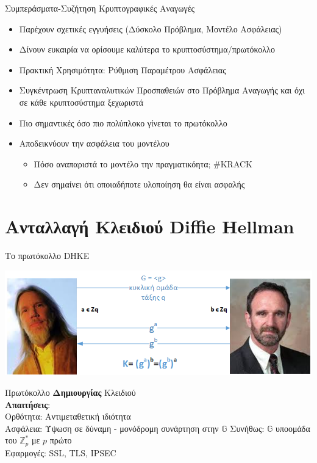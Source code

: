 \documentclass[handout]{beamer}
\begin{document}
\begin{frame}{Συμπεράσματα-Συζήτηση}
Κρυπτογραφικές Αναγωγές
\begin{itemize}
\item Παρέχουν σχετικές εγγυήσεις (Δύσκολο Πρόβλημα, Μοντέλο Ασφάλειας)
\item Δίνουν ευκαιρία να ορίσουμε καλύτερα το κρυπτοσύστημα/πρωτόκολλο
\item Πρακτική Χρησιμότητα: Ρύθμιση Παραμέτρου Ασφάλειας
\item Συγκέντρωση Κρυπταναλυτικών Προσπαθειών στο Πρόβλημα Αναγωγής και όχι σε κάθε κρυπτοσύστημα ξεχωριστά
\item Πιο σημαντικές όσο πιο πολύπλοκο γίνεται το πρωτόκολλο
\item Αποδεικνύουν την ασφάλεια του μοντέλου
\begin{itemize}
	\item Πόσο αναπαριστά το μοντέλο την πραγματικόητα; #KRACK
	\item Δεν σημαίνει ότι οποιαδήποτε υλοποίηση θα είναι ασφαλής
\end{itemize}
\end{itemize}
\end{frame}\section{Ανταλλαγή Κλειδιού Diffie Hellman}
\begin{frame}{Το πρωτόκολλο DHKE}
\begin{center}
\includegraphics[scale=0.55]{dh.png}
\end{center} 
\pause
Πρωτόκολλο \textbf{Δημιουργίας} Κλειδιού \\
\pause
\textbf{Απαιτήσεις}: \\
Ορθότητα: Αντιμεταθετική ιδιότητα \\
Ασφάλεια: Ύψωση σε δύναμη - μονόδρομη συνάρτηση στην $\mathbb{G}$
\pause 
Συνήθως: $\mathbb{G}$ υποομάδα του $\mathbb{Z}_p^*$ με $p$ πρώτο\\
\pause
Εφαρμογές: SSL, TLS, IPSEC
\end{frame}
\end{document}
